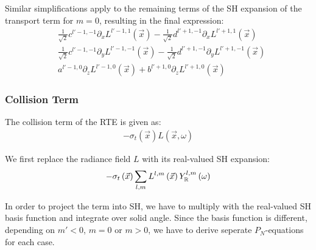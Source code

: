 \documentclass[10pt]{scrartcl}
\begin{document}
Similar simplifications apply to the remaining terms of the SH expansion of the transport term for $m=0$, resulting in the final expression:
\begin{align*}
&
\frac{1}{\sqrt{2}}c^{{l'-1,-1}}\partial_x L^{{l'-1,1}}\left (\vec{x} \right )
-\frac{1}{\sqrt{2}}d^{{l'+1,-1}}\partial_x L^{{l'+1,1}}\left (\vec{x} \right )
\\&
\frac{1}{\sqrt{2}}c^{{l'-1,-1}}\partial_y L^{{l'-1,-1}}\left (\vec{x} \right )
-\frac{1}{\sqrt{2}}d^{{l'+1,-1}}\partial_y L^{{l'+1,-1}}\left (\vec{x} \right )
\\&
a^{{l'-1,0}}\partial_z L^{{l'-1,0}}\left (\vec{x} \right)
+b^{{l'+1,0}}\partial_z L^{{l'+1,0}}\left (\vec{x} \right)
\end{align*}


\subsubsection{Collision Term}

The collision term of the RTE is given as:
\begin{align*}
-\sigma_t\left(\vec{x}\right)L\left(\vec{x}, \omega\right)
\end{align*}

We first replace the radiance field $L$ with its real-valued SH expansion:
\begin{align*}
-\sigma_t\left(\vec{x}\right)
\sum_{l,m}
{
L^{l,m}\left(\vec{x}\right )Y_{\mathbb{R}}^{l,m}\left(\omega\right)
}
\end{align*}

In order to project the term into SH, we have to multiply with the real-valued SH basis function and integrate over solid angle. Since the basis function is different, depending on $m'<0$, $m=0$ or $m>0$, we have to derive seperate $P_N$-equations for each case. 
\end{document}
